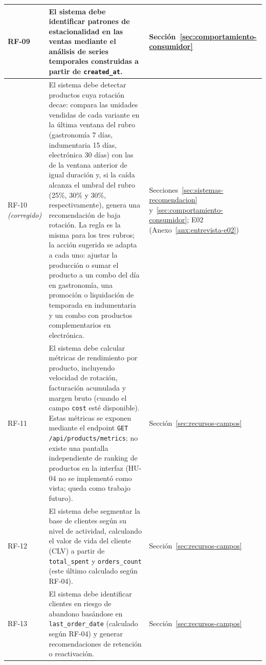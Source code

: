 \begin{longtable}{|m{1.7cm}|m{10.6cm}|m{2.7cm}|}
RF-09 & El sistema debe identificar patrones de estacionalidad en las ventas mediante el análisis de series temporales construidas a partir de \texttt{created\_at}. & Sección~\ref{sec:comportamiento-consumidor} \\
\hline

RF-10 \textit{(corregido)} & El sistema debe detectar productos cuya rotación decae: compara las unidades vendidas de cada variante en la última ventana del rubro (gastronomía 7 días, indumentaria 15 días, electrónica 30 días) con las de la ventana anterior de igual duración y, si la caída alcanza el umbral del rubro (25\%, 30\% y 30\%, respectivamente), genera una recomendación de baja rotación. La regla es la misma para los tres rubros; la acción sugerida se adapta a cada uno: ajustar la producción o sumar el producto a un combo del día en gastronomía, una promoción o liquidación de temporada en indumentaria y un combo con productos complementarios en electrónica. & Secciones~\ref{sec:sistemas-recomendacion} y~\ref{sec:comportamiento-consumidor}; E02 (Anexo~\ref{anx:entrevista-e02}) \\
\hline

RF-11 & El sistema debe calcular métricas de rendimiento por producto, incluyendo velocidad de rotación, facturación acumulada y margen bruto (cuando el campo \texttt{cost} esté disponible). Estas métricas se exponen mediante el endpoint \texttt{GET /api/products/metrics}; no existe una pantalla independiente de ranking de productos en la interfaz (HU-04 no se implementó como vista; queda como trabajo futuro). & Sección~\ref{sec:recursos-campos} \\
\hline

RF-12 & El sistema debe segmentar la base de clientes según su nivel de actividad, calculando el valor de vida del cliente (CLV) a partir de \texttt{total\_spent} y \texttt{orders\_count} (este último calculado según RF-04). & Sección~\ref{sec:recursos-campos} \\
\hline

RF-13 & El sistema debe identificar clientes en riesgo de abandono basándose en \texttt{last\_order\_date} (calculado según RF-04) y generar recomendaciones de retención o reactivación. & Sección~\ref{sec:recursos-campos} \\
\hline


\end{longtable}
